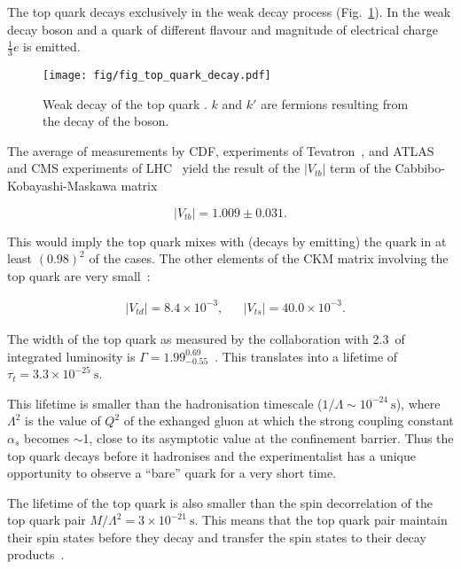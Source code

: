 The top quark decays exclusively in the weak decay process (Fig.~\ref{fig:quark_decay}). In the weak decay \PW boson and a quark of different flavour and magnitude of electrical charge $\frac{1}{3}e$ is emitted.

\begin{figure}[H]
  \centering
  \texttt{[image: fig/fig\_top\_quark\_decay.pdf]}
  \caption{Weak decay of the top quark \cPqt. $k$ and $k'$ are fermions resulting from the decay of the \PW boson.}
  \label{fig:quark_decay}
\end{figure}

The average of measurements by CDF, \DZERO experiments of Tevatron~\cite{Aaltonen:2015cra}, and ATLAS and CMS experiments of LHC~\cite{twiki:tt_curve_toplhcwg_sep18} yield the result of the $|V_{tb}|$ term of the Cabbibo-Kobayashi-Maskawa matrix

\begin{equation}
  |V_{tb}|=1.009\pm0.031.
\end{equation}

This would imply the top quark mixes with (decays by emitting) the \cPqb quark in at least $(0.98)^{2}$ of the cases. The other elements of the CKM matrix involving the top quark are very small~\cite{Patrignani:2016xqp}:

\begin{align}
  & |V_{td}|=8.4\times10^{-3}, && |V_{ts}|=40.0\times10^{-3}.
\end{align}

The width of the top quark as measured by the \DZERO collaboration \cite{Abazov:2010tm} with 2.3~\fbinv of integrated luminosity is $\Gamma=1.99^{0.69}_{-0.55}$~\GeV. This translates into a lifetime of $\tau_{t}=3.3\times10^{-25}~\text{s}$.

This lifetime is smaller than the hadronisation timescale ($1/\Lambda\sim10^{-24}~\text{s}$), where $\Lambda^{2}$ is the value of $Q^{2}$ of the exhanged gluon at which the strong coupling constant $\alpha_{s}$ becomes $\sim$1, close to its asymptotic value at the confinement barrier. Thus the top quark decays before it hadronises and the experimentalist has a unique opportunity to observe a ``bare'' quark for a very short time.

The lifetime of the top quark is also smaller than the spin decorrelation of the top quark pair $M/{\Lambda^{2}}=3\times10^{-21}~\text{s}$. This means that the top quark pair maintain their spin states before they decay and transfer the spin states to their decay products~\cite{Cristinziani:2016vif}.

